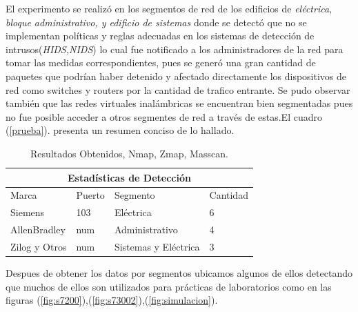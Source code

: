 \documentclass[jou]{apa6}   %
\begin{document}
El experimento se realizó en los segmentos de red de los edificios de \textit{eléctrica, bloque administrativo, y edificio de sistemas} donde se detectó que no se implementan políticas y reglas adecuadas en los sistemas de detección de intrusos(\textit{HIDS,NIDS}) lo cual fue notificado a los administradores de la red para tomar las medidas correspondientes, pues se generó una gran cantidad de paquetes que podrían haber detenido y afectado directamente los dispositivos de red como switches y routers por la cantidad de trafico entrante. Se pudo observar también que las redes virtuales inalámbricas se encuentran bien segmentadas pues no fue posible acceder a otros segmentes de red a través de estas.El cuadro (\ref{prueba}).  presenta un resumen conciso de lo hallado.

\begin{table}[htb]
\centering
\begin{tabular}{| p{1.8cm}| p{1.1cm} |p{1.9cm}|p{1.2cm}|}
\hline
\multicolumn{4}{|c|}{Estadísticas de Detección} \\
\hline
Marca & Puerto & Segmento & Cantidad\\
\hline 
Siemens & 103 & Eléctrica & 6\\ \hline
AllenBradley & num  & Administrativo & 4\\ \hline
Zilog y Otros & num  & Sistemas y Eléctrica & 3 \\ \hline
\end{tabular}
\caption{Resultados Obtenidos, Nmap, Zmap, Masscan.}
\label{fig:prueba}
\end{table}
Despues de obtener los datos por segmentos ubicamos algunos de ellos detectando que muchos de ellos son utilizados para prácticas de laboratorios como en las figuras  (\ref{fig:s7200}),(\ref{fig:s73002}),(\ref{fig:simulacion}).
\end{document}
